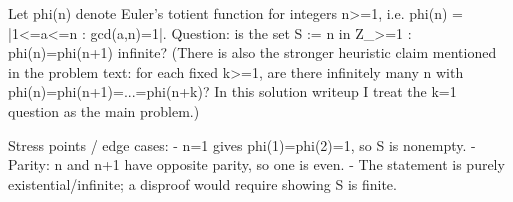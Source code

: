 Let phi(n) denote Euler's totient function for integers n>=1, i.e.
phi(n) = |{1<=a<=n : gcd(a,n)=1}|.
Question: is the set
  S := { n in Z_{>=1} : phi(n)=phi(n+1) }
infinite?
(There is also the stronger heuristic claim mentioned in the problem text: for each fixed k>=1, are there infinitely many n with phi(n)=phi(n+1)=...=phi(n+k)? In this solution writeup I treat the k=1 question as the main problem.)

Stress points / edge cases:
- n=1 gives phi(1)=phi(2)=1, so S is nonempty.
- Parity: n and n+1 have opposite parity, so one is even.
- The statement is purely existential/infinite; a disproof would require showing S is finite.
